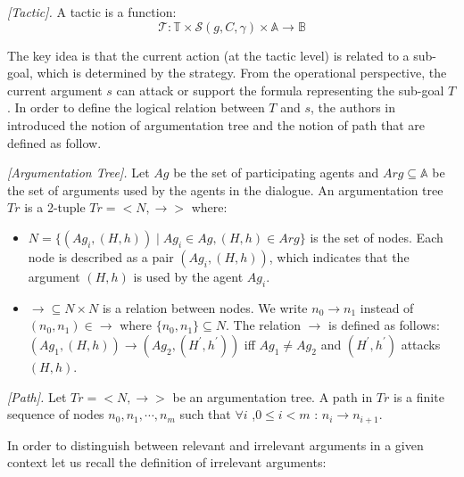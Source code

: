\begin{definition}{\emph{[Tactic]. }} \label{tactic}
A tactic is a function:
\begin{equation}\label{equation2}
\mathcal{T}: \mathbb{T} \times \mathcal{S}(g,C,\gamma) \times
\mathbb{A} \rightarrow \mathbb{B}
\end{equation}
\end{definition}

The key idea is that the current action (at the tactic level) is related to a sub-goal, which is determined by the strategy. From
the operational perspective, the current argument $s$ can attack or support the formula representing the sub-goal $T$. In order to
define the logical relation between $T$ and $s$, the authors in \cite{Mbarki06} introduced the notion of argumentation tree and
the notion of path that are defined as follow.

\begin{definition}{\emph{[Argumentation Tree].}} \label{tree}
Let $Ag$ be the set of participating agents and $Arg \subseteq \mathbb{A}$ be the set of arguments used by the agents in the
dialogue. An argumentation tree $Tr$ is a 2-tuple $Tr =\big<N,\rightarrow\big>$ where:

\begin{itemize}
  \item $N = \{(Ag_i, (H, h)) \mid Ag_i \in Ag, (H, h) \in Arg \}$ is the set of nodes. Each node is described as a pair $(Ag_i, (H, h))$,
  which indicates that the argument $(H, h)$ is used by the agent $Ag_i$.
  \item $ \rightarrow \subseteq  N \times N $ is a relation between nodes. We write $n_0 \rightarrow n_1$ instead of $(n_0, n_1) \in \rightarrow $
  where $\{n_0, n_1\} \subseteq N$. The relation $ \rightarrow $ is defined as follows:
       $(Ag_1, (H, h)) \rightarrow (Ag_2, (H^{\prime}, h^{\prime}))$ iff $Ag_1 \neq Ag_2$ and $(H^{\prime}, h^{\prime})$ attacks $(H, h)$.
\end{itemize}
\end{definition}

\begin{definition}{\emph{[Path]. }} \label{path}
Let $Tr = \big<N, \rightarrow \big>$ be an argumentation tree. A path in $Tr$ is a finite sequence of nodes $n_0, n_1,\cdots , n_m$
such that $\forall i$ ,$   0 \leq i < m $ : $n_i \rightarrow n_{i+1}$.
\end{definition}

In order to distinguish between relevant and irrelevant arguments in a given context  let us recall the definition of irrelevant
arguments:

